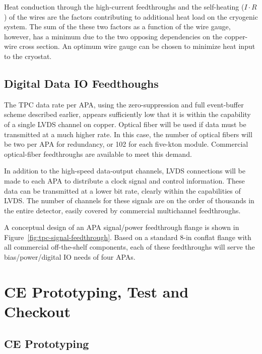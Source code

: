 Heat conduction through the high-current feedthroughs and the self-heating ($I\cdot R$) of the wires are the factors
contributing to additional heat load on the cryogenic system.
The sum of the these two factors as a function of the wire gauge, however, has a minimum 
due to the two opposing dependencies on the copper-wire cross section.
An optimum wire gauge can be chosen to minimize heat input to the cryostat.

\subsection{Digital Data IO Feedthoughs}
\label{subsec:ce-feedthru-digital}

The TPC data rate per APA, using the zero-suppression and full event-buffer scheme described earlier, appears sufficiently low that it is within the capability of a single LVDS channel on copper. Optical fiber will be used if data must be transmitted at a much higher rate.  In this case, the number of optical fibers will be two per APA for redundancy, or 102 for each five-kton module. Commercial optical-fiber feedthroughs are available to meet this demand.

In addition to the high-speed data-output channels,  LVDS connections will be made to each APA to 
distribute a clock signal and control information.  These data 
can be transmitted at a lower bit rate, clearly within the
capabilities of LVDS. The number of channels for these signals 
are on the order of thousands in the entire detector, easily covered by commercial multichannel feedthroughs. 

A conceptual design of an APA signal/power feedthrough flange is shown in Figure~\ref{fig:tpc-signal-feedthrough}.  Based on a standard 8-in conflat flange with all commercial off-the-shelf components, each of these feedthroughs will serve the bias/power/digital IO needs of four APAs.  

\section{CE Prototyping, Test and  Checkout}
\label{sec:ce-checkout}

\subsection{CE Prototyping}
\label{sec:ce-checkout-prototype}

